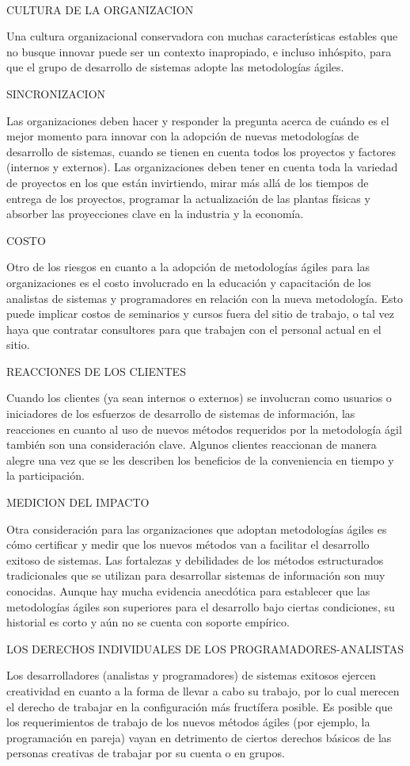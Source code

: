     \\
CULTURA DE LA ORGANIZACION \par
Una cultura organizacional conservadora con muchas características estables que no busque innovar puede ser un contexto inapropiado, e incluso inhóspito, para que el grupo de desarrollo de sistemas adopte las metodologías ágiles.\par
SINCRONIZACION\par
Las organizaciones deben hacer y responder la pregunta acerca de cuándo es el mejor momento para innovar con la adopción de nuevas metodologías de desarrollo de sistemas, cuando se tienen en cuenta todos los proyectos y factores (internos y externos). Las organizaciones deben tener en cuenta toda la variedad de proyectos en los que están invirtiendo, mirar más allá de los tiempos de entrega de los proyectos, programar la actualización de las plantas físicas y absorber las proyecciones clave en la industria y la economía.\par
COSTO\par
Otro de los riesgos en cuanto a la adopción de metodologías ágiles para las organizaciones es el costo involucrado en la educación y capacitación de los analistas de sistemas y programadores en relación con la nueva metodología. Esto puede implicar costos de seminarios y cursos fuera del sitio de trabajo, o tal vez haya que contratar consultores para que trabajen con el personal actual en el sitio.\par
REACCIONES DE LOS CLIENTES\par
Cuando los clientes (ya sean internos o externos) se involucran como usuarios o iniciadores de los esfuerzos de desarrollo de sistemas de información, las reacciones en cuanto al uso de nuevos métodos requeridos por la metodología ágil también son una consideración clave. Algunos clientes reaccionan de manera alegre una vez que se les describen los beneficios de la conveniencia en tiempo y la participación.\par
MEDICION DEL IMPACTO\par
Otra consideración para las organizaciones que adoptan metodologías ágiles es cómo certificar y medir que los nuevos métodos van a facilitar el desarrollo exitoso de sistemas. Las fortalezas y debilidades de los métodos estructurados tradicionales que se utilizan para desarrollar sistemas de información son muy conocidas. Aunque hay mucha evidencia anecdótica para establecer que las metodologías ágiles son superiores para el desarrollo bajo ciertas condiciones, su historial es corto y aún no se cuenta con soporte empírico.\par
LOS DERECHOS INDIVIDUALES DE LOS PROGRAMADORES-ANALISTAS\par
Los desarrolladores (analistas y programadores) de sistemas exitosos ejercen creatividad en cuanto a la forma de llevar a cabo su trabajo, por lo cual merecen el derecho de trabajar en la configuración más fructífera posible. Es posible que los requerimientos de trabajo de los nuevos métodos ágiles (por ejemplo, la programación en pareja) vayan en detrimento de ciertos derechos básicos de las personas creativas de trabajar por su cuenta o en grupos.\par

